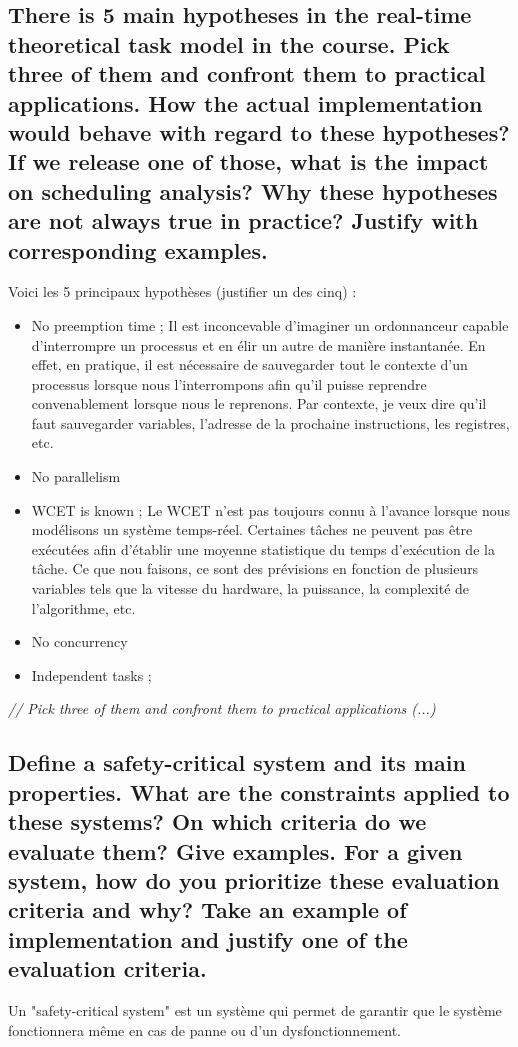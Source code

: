 \subsection{There is 5 main hypotheses in the real-time theoretical task model in the course. Pick three of them and
confront them to practical applications. How the actual implementation would behave with regard to these
hypotheses? If we release one of those, what is the impact on scheduling analysis? Why these hypotheses
are not always true in practice? Justify with corresponding examples.}
Voici les 5 principaux hypothèses (justifier un des cinq) :
\begin{itemize}
\item No preemption time ; Il est inconcevable d'imaginer un ordonnanceur capable d'interrompre un processus et en élir un autre de manière instantanée. En effet, en pratique, il est nécessaire de sauvegarder tout le contexte d'un processus lorsque nous l'interrompons afin qu'il puisse reprendre convenablement lorsque nous le reprenons. Par contexte, je veux dire qu'il faut sauvegarder variables, l'adresse de la prochaine instructions, les registres, etc.

\item No parallelism

\item WCET is known ; Le WCET n'est pas toujours connu à l'avance lorsque nous modélisons un système temps-réel. Certaines tâches ne peuvent pas être exécutées afin d'établir une moyenne statistique du temps d'exécution de la tâche. Ce que nou faisons, ce sont des prévisions en fonction de plusieurs variables tels que la vitesse du hardware, la puissance, la complexité de l'algorithme, etc.

\item No concurrency


\item Independent tasks ; 


\end{itemize}

\textit{// Pick three of them and confront them to practical applications (...)}


\subsection{Define a safety-critical system and its main properties. What are the constraints applied to these systems?
On which criteria do we evaluate them? Give examples. For a given system, how do you prioritize these
evaluation criteria and why? Take an example of implementation and justify one of the evaluation criteria.}
Un "safety-critical system" est un système qui permet de garantir que le système fonctionnera même en cas de panne ou d'un dysfonctionnement. 
